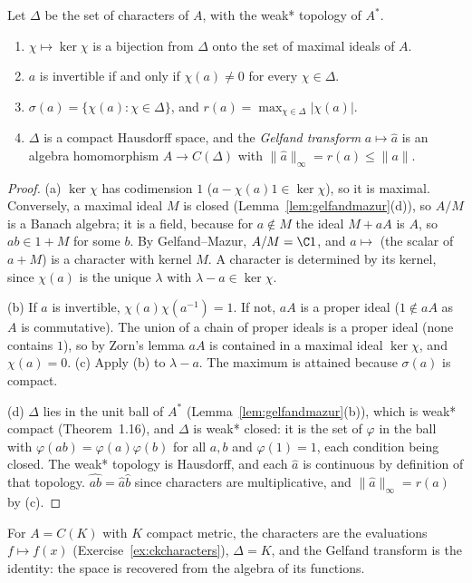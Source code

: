 \begin{theorem}[Gelfand, 1941]\label{thm:gelfand}
Let $\Delta$ be the set of characters of $A$, with the weak* topology of $A^*$.
\begin{enumerate}
\item[(a)] $\chi\mapsto\ker\chi$ is a bijection from $\Delta$ onto the set of maximal ideals of $A$.
\item[(b)] $a$ is invertible if and only if $\chi(a)\ne0$ for every $\chi\in\Delta$.
\item[(c)] $\sigma(a)=\{\chi(a):\chi\in\Delta\}$, and $r(a)=\max_{\chi\in\Delta}|\chi(a)|$.
\item[(d)] $\Delta$ is a compact Hausdorff space, and the \emph{Gelfand transform} $a\mapsto\hat a$ is an algebra homomorphism $A\to C(\Delta)$ with $\|\hat a\|_\infty=r(a)\le\|a\|$.
\end{enumerate}
\end{theorem}
\begin{proof}
(a) $\ker\chi$ has codimension $1$ ($a-\chi(a)1\in\ker\chi$), so it is maximal. Conversely, a maximal ideal $M$ is closed (Lemma~\ref{lem:gelfandmazur}(d)), so $A/M$ is a Banach algebra; it is a field, because for $a\notin M$ the ideal
$M+aA$ is $A$, so $ab\in1+M$ for some $b$. By Gelfand--Mazur, $A/M=\C1$, and $a\mapsto$ (the scalar of $a+M$) is a character with kernel $M$. A character is determined by its kernel, since $\chi(a)$ is the unique $\lambda$ with $\lambda-a\in\ker\chi$.

(b) If $a$ is invertible, $\chi(a)\chi(a^{-1})=1$. If not, $aA$ is a proper ideal ($1\notin aA$ as $A$ is commutative). The union of a chain of proper ideals is a proper ideal (none contains $1$), so by Zorn's lemma $aA$ is contained in
a maximal ideal $\ker\chi$, and $\chi(a)=0$. (c) Apply (b) to $\lambda-a$. The maximum is attained because $\sigma(a)$ is compact.

(d) $\Delta$ lies in the unit ball of $A^*$ (Lemma~\ref{lem:gelfandmazur}(b)), which is weak* compact (Theorem~1.16), and $\Delta$ is weak* closed: it is the set of $\varphi$ in the ball with $\varphi(ab)=\varphi(a)\varphi(b)$ for all $a,b$ and
$\varphi(1)=1$, each condition being closed. The weak* topology is Hausdorff, and each $\hat a$ is continuous by definition of that topology. $\widehat{ab}=\hat a\hat b$ since characters are multiplicative, and $\|\hat a\|_\infty=r(a)$ by (c).
\end{proof}

For $A=C(K)$ with $K$ compact metric, the characters are the evaluations $f\mapsto f(x)$ (Exercise~\ref{ex:ckcharacters}), $\Delta=K$, and the Gelfand transform is the identity: the space is recovered from the algebra of its functions.

